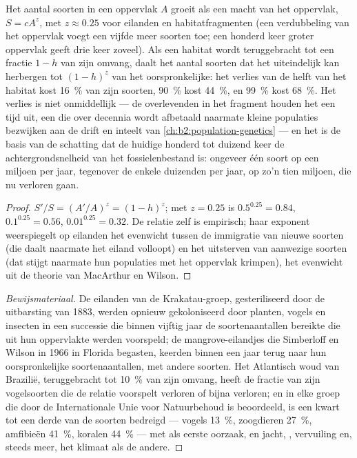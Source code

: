 \begin{theorem}\label{thm:b2:global-change:sar}
Het aantal soorten in een oppervlak $A$ groeit als een macht van het
oppervlak, $S = cA^{z}$, met $z \approx 0.25$ voor eilanden en
habitatfragmenten (een verdubbeling van het oppervlak voegt een vijfde meer
soorten toe; een honderd keer groter oppervlak geeft drie keer zoveel). Als een
habitat wordt teruggebracht tot een fractie $1 - h$ van zijn omvang, daalt het
aantal soorten dat het uiteindelijk kan herbergen tot $(1 - h)^{z}$ van het
oorspronkelijke: het verlies van de helft van het habitat kost \qty{16}{\%} van
zijn soorten, \qty{90}{\%} kost \qty{44}{\%}, en \qty{99}{\%} kost
\qty{68}{\%}. Het verlies is niet onmiddellijk --- de overlevenden in het
fragment houden het een tijd uit, een \emph{} die over
decennia wordt afbetaald naarmate kleine populaties bezwijken aan de drift en
inteelt van \cref{ch:b2:population-genetics} --- en het is de basis van de
schatting dat de huidige  honderd tot duizend keer de
achtergrondsnelheid van het fossielenbestand is: ongeveer één soort op een
miljoen per jaar, tegenover de enkele duizenden per jaar, op zo'n tien miljoen,
die nu verloren gaan.
\end{theorem}
\begin{proof}
$S'/S = (A'/A)^{z} = (1 - h)^{z}$; met $z = 0.25$ is $0.5^{0.25} =
0.84$, $0.1^{0.25} = 0.56$, $0.01^{0.25} = 0.32$. De relatie
zelf is empirisch; haar exponent weerspiegelt op eilanden het evenwicht
tussen de immigratie van nieuwe soorten (die daalt naarmate het eiland
volloopt) en het uitsterven van aanwezige soorten (dat stijgt naarmate hun
populaties met het oppervlak krimpen), het evenwicht uit de theorie van
MacArthur en Wilson.
\end{proof}
\begin{proof}[Bewijsmateriaal]
De eilanden van de Krakatau-groep, gesteriliseerd door de uitbarsting van
1883, werden opnieuw gekoloniseerd door planten, vogels en insecten in een
successie die binnen vijftig jaar de soortenaantallen bereikte die uit hun
oppervlakte werden voorspeld; de mangrove-eilandjes die Simberloff en
Wilson in 1966 in Florida begasten, keerden binnen een jaar terug naar hun
oorspronkelijke soortenaantallen, met andere soorten. Het Atlantisch
woud van Brazilië, teruggebracht tot \qty{10}{\%} van zijn omvang, heeft de
fractie van zijn vogelsoorten die de relatie voorspelt verloren of bijna
verloren; en in elke groep die door de Internationale Unie voor Natuurbehoud is
beoordeeld, is een kwart tot een derde van de soorten bedreigd --- vogels
\qty{13}{\%}, zoogdieren \qty{27}{\%}, amfibieën \qty{41}{\%}, koralen
\qty{44}{\%} --- met  als eerste oorzaak, en jacht,
, vervuiling en, steeds meer, het klimaat als de andere.
\end{proof}

